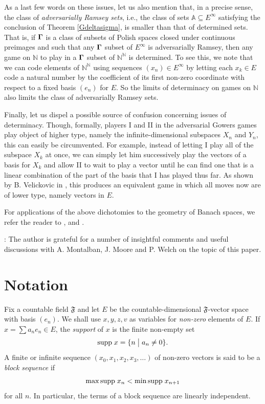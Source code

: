 \documentclass[10pt]{amsart}
\newcommand {\A}{\mathbb A}
\newcommand {\N}{\mathbb N}
\newcommand {\del}{ \; \big| \;}
\newcommand {\go} {\mathfrak}
\theoremstyle{definition}
\begin{document}
As a last few words on these issues, let us also mention that, in a precise sense, the class of {\em adversarially Ramsey sets}, i.e., the class of sets $\A\subseteq  E^\infty$ satisfying the conclusion of Theorem \ref{Gdeltasigma}, is smaller than that of determined sets. That is, if $\bf \Gamma$ is a class of subsets of Polish spaces closed under continuous preimages and such that any $\bf \Gamma$ subset of $E^\infty$ is adversarially Ramsey, then any game on $\N$ to play in a $\bf \Gamma$ subset of $\N^\N$ is determined. To see this, we note that we can code elements of $\N^\N$ using sequences $(x_n)\in E^\infty$ by letting each $x_k\in E$ code a natural number by the coefficient of its first non-zero coordinate with respect to a fixed basis $(e_n)$ for $E$. So the limits of determinacy on games on $\N$ also limits the class of adversarially Ramsey sets. 

Finally, let us dispel a possible source of confusion concerning issues of determinacy. Though, formally, players I and II in the adversarial Gowers games play object of higher type, namely the infinite-dimensional subspaces $X_n$ and $Y_n$, this can easily be circumvented. For example, instead of letting I play all of the subspace $X_k$ at once, we can simply let him successively play the vectors of a basis for $X_k$ and allow II to wait to play a vector until he can find one that is a linear combination of the part of the basis that I has played thus far. As shown  by B. Velickovic in \cite{jordi}, this produces an equivalent game in which all moves now are of lower type, namely vectors in $E$. 

For applications of the above dichotomies to the geometry of Banach spaces, we refer the reader to \cite{gowers}, \cite{minimal} and \cite{alpha}.

: The author is grateful for a number of insightful comments and useful discussions with A. Montalban, J. Moore and P. Welch on the topic of this paper.  



\section{Notation}
Fix  a countable field $\mathfrak F$ and let $E$ be the countable-dimensional $\go
F$-vector space with basis $(e_n)$. We shall use $x,y,z,v$ as variables for {\em non-zero}
elements of $E$. If $x=\sum a_ne_n\in E$, the {\em support} of $x$ is the finite non-empty set  
$$
{\rm supp}\; x=\{n\del a_n\neq 0\}.
$$
A finite or infinite sequence $(x_0,x_1,x_2,x_3,\ldots)$ of non-zero vectors is said to be a {\em block sequence}
if  
$$
\max {\rm supp}\; x_n<\min{\rm supp}\; x_{n+1}
$$ 
for all $n$. In particular, the terms of a block sequence are linearly independent.
\end{document}
